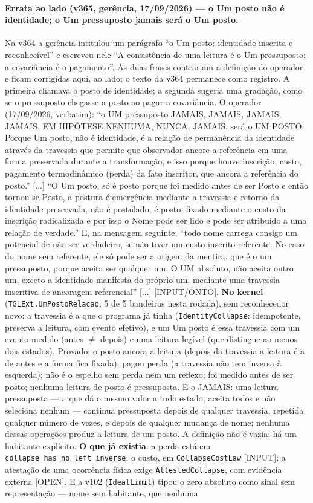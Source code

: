\documentclass[11pt]{article}
\theoremstyle{definition}\newtheorem{deriv}{Derivação}
\begin{document}
\paragraph*{Errata ao lado (v365, gerência, 17/09/2026) --- o Um posto não é identidade; o Um pressuposto jamais será o Um posto.} Na v364 a gerência intitulou um parágrafo ``o Um posto: identidade inscrita e reconhecível'' e escreveu nele ``A consistência de uma leitura é o Um pressuposto; a covariância é o pagamento''. As duas frases contrariam a definição do operador e ficam corrigidas aqui, ao lado; o texto da v364 permanece como registro. A primeira chamava o posto de identidade; a segunda sugeria uma gradação, como se o pressuposto chegasse a posto ao pagar a covariância. O operador (17/09/2026, verbatim): ``o UM pressuposto JAMAIS, JAMAIS, JAMAIS, JAMAIS, EM HIPÓTESE NENHUMA, NUNCA, JAMAIS, será o UM POSTO. Porque Um posto, não é identidade, é a relação de permanência da identidade através da travessia que permite que observador ancore a referência em uma forma preservada durante a transformação, e isso porque houve inscrição, custo, pagamento termodinâmico (perda) da fato inscritor, que ancora a referência do posto.'' [...] ``O Um posto, só é posto porque foi medido antes de ser Posto e então tornou-se Posto, a postura é emergência mediante a travessia e retorno da identidade preservada, não é postulado, é posto, fixado mediante o custo da inscrição radicalizada e por isso o Nome pode ser lido e pode ser atribuído a uma relação de verdade.'' E, na mensagem seguinte: ``todo nome carrega consigo um potencial de não ser verdadeiro, se não tiver um custo inscrito referente. No caso do nome sem referente, ele só pode ser a origem da mentira, que é o um pressuposto, porque aceita ser qualquer um. O UM absoluto, não aceita outro um, exceto a identidade manifesta do próprio um, mediante uma travessia inscritiva de ancoragem referencial'' [...] [INPUT/ONTO]. \textbf{No kernel} (\texttt{TGLExt.UmPostoRelacao}, 5 de 5 bandeiras nesta rodada), sem reconhecedor novo: a travessia é a que o programa já tinha (\texttt{IdentityCollapse}: idempotente, preserva a leitura, com evento efetivo), e um Um posto é essa travessia com um evento medido (antes $\neq$ depois) e uma leitura legível (que distingue ao menos dois estados). Provado: o posto ancora a leitura (depois da travessia a leitura é a de antes e a forma fica fixada); pagou perda (a travessia não tem inversa à esquerda); não é o espelho sem perda nem um reflexo; foi medido antes de ser posto; nenhuma leitura de posto é pressuposta. E o JAMAIS: uma leitura pressuposta --- a que dá o mesmo valor a todo estado, aceita todos e não seleciona nenhum --- continua pressuposta depois de qualquer travessia, repetida qualquer número de vezes, e depois de qualquer mudança de nome; nenhuma dessas operações produz a leitura de um posto. A definição não é vazia: há um habitante explícito. \textbf{O que já existia}: a perda está em \texttt{collapse\_has\_no\_left\_inverse}; o custo, em \texttt{CollapseCostLaw} [INPUT]; a atestação de uma ocorrência física exige \texttt{AttestedCollapse}, com evidência externa [OPEN]. E a v102 (\texttt{IdealLimit}) tipou o zero absoluto como sinal sem representação --- nome sem habitante, que nenhuma 
\end{document}
